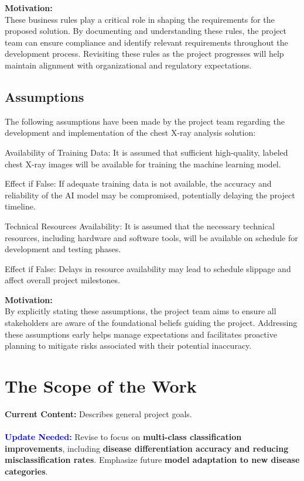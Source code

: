 \documentclass[12pt]{article}
\begin{document}
\textbf{Motivation:}\\
These business rules play a critical role in shaping the requirements for the proposed solution. 
By documenting and understanding these rules, the project team can ensure compliance and identify 
relevant requirements throughout the development process. Revisiting these rules as the project 
progresses will help maintain alignment with organizational and regulatory expectations.


\subsection{Assumptions}
The following assumptions have been made by the project team regarding the development and 
implementation of the chest X-ray analysis solution:

Availability of Training Data: It is assumed that sufficient high-quality, labeled chest X-ray 
images will be available for training the machine learning model.

Effect if False: If adequate training data is not available, the accuracy and reliability of the 
AI model may be compromised, potentially delaying the project timeline.

Technical Resources Availability: It is assumed that the necessary technical resources, including 
hardware and software tools, will be available on schedule for development and testing phases.

Effect if False: Delays in resource availability may lead to schedule slippage and affect overall 
project milestones.

\textbf{Motivation:}\\
By explicitly stating these assumptions, the project team aims to ensure all stakeholders are 
aware of the foundational beliefs guiding the project. Addressing these assumptions early helps 
manage expectations and facilitates proactive planning to mitigate risks associated with their 
potential inaccuracy.

\section{The Scope of the Work}

\textbf{Current Content:} Describes general project goals. \\
\\
\textbf{\textcolor{blue}{Update Needed:}} Revise to focus on \textbf{multi-class classification improvements}, including \textbf{disease differentiation accuracy and reducing misclassification rates}. Emphasize future \textbf{model adaptation to new disease categories}.
\end{document}
